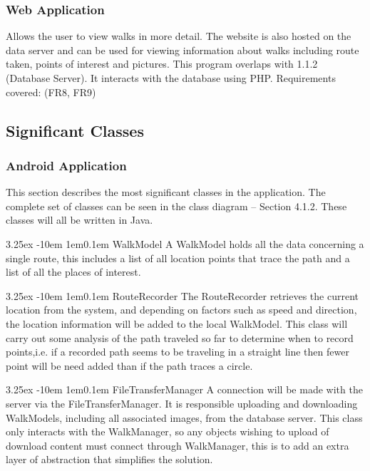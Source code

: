 \documentclass[12pt]{article}
\makeatletter
\renewcommand{\paragraph}{
  \@startsection{paragraph}{4}
  {\z@}{3.25ex \@plus -10em \@minus 1em}{0.1em}
  {\normalfont\normalsize\bfseries}
}
\newcommand{\zeroindent}{\setlength{\parindent}{0pt}}
\makeatother
\begin{document}
\subsubsection{Web Application}
Allows the user to view walks in more detail. The website is also hosted on the data server and can be used for viewing information about walks including route taken, points of interest and pictures. This program overlaps with 1.1.2 (Database Server). It interacts with the database using PHP. 
Requirements covered: (FR8, FR9)
\subsection{Significant Classes}
\subsubsection{Android Application}
This section describes the most significant classes in the application. The complete set of classes can be seen in the class diagram – Section 4.1.2. These classes will all be written in Java.
\paragraph{WalkModel}
\zeroindent
A WalkModel holds all the data concerning a single route, this includes a list of all location points that trace the path and a list of all the places of interest.
\paragraph{RouteRecorder}
\zeroindent
The RouteRecorder retrieves the current location from the system, and depending on factors such as speed and direction, the location information will be added to the local WalkModel. This class will carry out some analysis of the path traveled so far to determine when to record points,i.e. if a recorded path seems to be traveling in a straight line then fewer point will be need added than if the path traces a circle.
\paragraph{FileTransferManager}
\zeroindent 
A connection will be made with the server via the FileTransferManager. It is responsible uploading and downloading WalkModels, including all associated images, from the database server. This class only interacts with the WalkManager, so any objects wishing to upload of download content must connect through WalkManager, this is to add an extra layer of abstraction that simplifies the solution.
\end{document}

